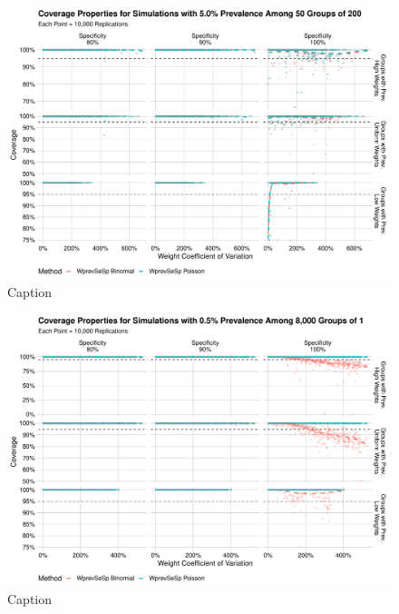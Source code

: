 \documentclass[AMA,STIX1COL]{WileyNJD-v2}
\begin{document}
\begin{figure}
    \centering
    \includegraphics[width=\textwidth]{figures/imperfect_coverage_50_0_05_reduced.pdf}
    \caption{Caption}
    \label{fig:imperfect_coverage_50_0_05_reduced}
\end{figure}


\begin{figure}
    \centering
    \includegraphics[width=\textwidth]{figures/imperfect_coverage_8000_0_005_reduced.pdf}
    \caption{Caption}
    \label{fig:imperfect_coverage_8000_0_005_reduced}
\end{figure}
\end{document}
